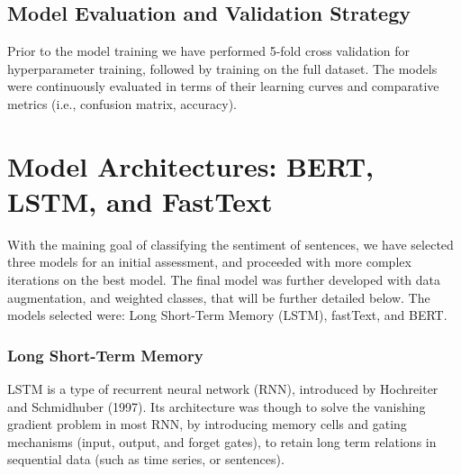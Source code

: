 \documentclass[conference]{IEEEtran}
\begin{document}

\subsection{Model Evaluation and Validation Strategy}

Prior to the model training we have performed 5-fold cross validation for hyperparameter training, followed by training on the full dataset. The models were continuously evaluated in terms of their learning curves and comparative metrics (i.e., confusion matrix, accuracy).





\section{Model Architectures: BERT, LSTM, and FastText}

With the maining goal of classifying the sentiment of sentences, we have selected three models for an initial assessment, and proceeded with more complex iterations on the best model. The final model was further developed with data augmentation, and weighted classes, that will be further detailed below. The models selected were: Long Short-Term Memory (LSTM), fastText, and BERT.

\subsubsection{Long Short-Term  Memory}

LSTM is a type of recurrent neural network (RNN), introduced by Hochreiter and Schmidhuber (1997). Its architecture was though to solve the vanishing gradient problem in most RNN, by introducing memory cells and gating mechanisms (input, output, and forget gates), to retain long term relations in sequential data (such as time series, or sentences).
\end{document}
